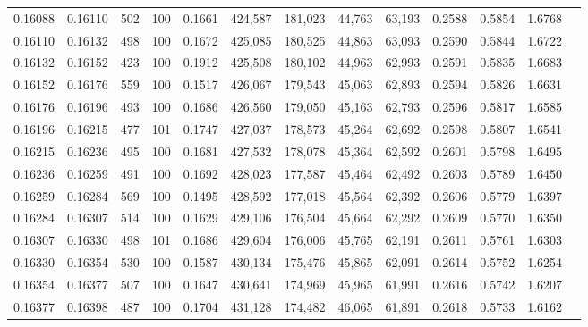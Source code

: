 \begin{tabular}{rrrrrrrrrrrrr}
0.16088 & 0.16110 &   502 & 100 &                                     0.1661 & 424,587 & 181,023 &  44,763 &  63,193 & 0.2588 & 0.5854 & 1.6768 \\
0.16110 & 0.16132 &   498 & 100 &                                     0.1672 & 425,085 & 180,525 &  44,863 &  63,093 & 0.2590 & 0.5844 & 1.6722 \\
0.16132 & 0.16152 &   423 & 100 &                                     0.1912 & 425,508 & 180,102 &  44,963 &  62,993 & 0.2591 & 0.5835 & 1.6683 \\
0.16152 & 0.16176 &   559 & 100 &                                     0.1517 & 426,067 & 179,543 &  45,063 &  62,893 & 0.2594 & 0.5826 & 1.6631 \\
0.16176 & 0.16196 &   493 & 100 &                                     0.1686 & 426,560 & 179,050 &  45,163 &  62,793 & 0.2596 & 0.5817 & 1.6585 \\
0.16196 & 0.16215 &   477 & 101 &                                     0.1747 & 427,037 & 178,573 &  45,264 &  62,692 & 0.2598 & 0.5807 & 1.6541 \\
0.16215 & 0.16236 &   495 & 100 &                                     0.1681 & 427,532 & 178,078 &  45,364 &  62,592 & 0.2601 & 0.5798 & 1.6495 \\
0.16236 & 0.16259 &   491 & 100 &                                     0.1692 & 428,023 & 177,587 &  45,464 &  62,492 & 0.2603 & 0.5789 & 1.6450 \\
0.16259 & 0.16284 &   569 & 100 &                                     0.1495 & 428,592 & 177,018 &  45,564 &  62,392 & 0.2606 & 0.5779 & 1.6397 \\
0.16284 & 0.16307 &   514 & 100 &                                     0.1629 & 429,106 & 176,504 &  45,664 &  62,292 & 0.2609 & 0.5770 & 1.6350 \\
0.16307 & 0.16330 &   498 & 101 &                                     0.1686 & 429,604 & 176,006 &  45,765 &  62,191 & 0.2611 & 0.5761 & 1.6303 \\
0.16330 & 0.16354 &   530 & 100 &                                     0.1587 & 430,134 & 175,476 &  45,865 &  62,091 & 0.2614 & 0.5752 & 1.6254 \\
0.16354 & 0.16377 &   507 & 100 &                                     0.1647 & 430,641 & 174,969 &  45,965 &  61,991 & 0.2616 & 0.5742 & 1.6207 \\
0.16377 & 0.16398 &   487 & 100 &                                     0.1704 & 431,128 & 174,482 &  46,065 &  61,891 & 0.2618 & 0.5733 & 1.6162 \\

\end{tabular}
